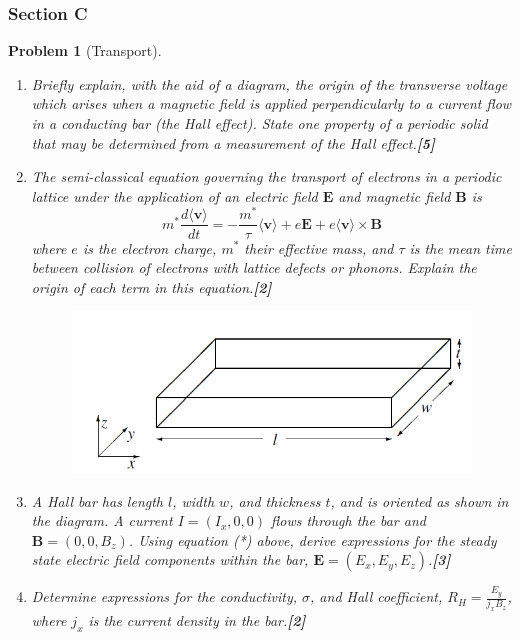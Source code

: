 \documentclass[a4paper]{article}
\theoremstyle{new}
\newtheorem{qns}{Problem}[subsection]
\begin{document}
\subsubsection{Section C}
\begin{qns}[Transport]\leavevmode
\begin{enumerate}[label=(\roman*)]
\item Briefly explain, with the aid of a diagram, the origin of the transverse voltage which arises when a magnetic field is applied perpendicularly to a current flow in a conducting bar (the Hall effect). State one property of a periodic solid that may be determined from a measurement of the Hall effect.\hfill\textbf{[5]}
\item The semi-classical equation governing the transport of electrons in a periodic lattice under the application of an electric field $\mathbf{E}$ and magnetic field $\mathbf{B}$ is
\begin{equation}
  m^*\frac{d\langle\mathbf{v}\rangle}{dt}=-\frac{m^*}{\tau}\langle\mathbf{v}\rangle+e\mathbf{E}+e\langle\mathbf{v}\rangle\times\mathbf{B}\tag{*}  
\end{equation}
where $e$ is the electron charge, $m^*$ their effective mass, and $\tau$ is the mean time between collision of electrons with lattice defects or phonons. Explain the origin of each term in this equation.\hfill\textbf{[2]}
\begin{figure}[H]
    \centering
    \includegraphics[scale=0.5]{2016P2C10Q.PNG}
\end{figure}
\item A Hall bar has length $l$, width $w$, and thickness $t$, and is oriented as shown in the diagram. A current $I = (I_x, 0, 0)$ flows through the bar and $\mathbf{B}=(0,0,B_z)$. Using equation (*) above, derive expressions for the steady state electric field components within the bar, $\mathbf{E}=(E_x,E_y,E_z)$.\hfill\textbf{[3]}
\item Determine expressions for the conductivity, $\sigma$, and Hall coefficient, $R_H=\frac{E_y}{j_xB_z}$, where $j_x$ is the current density in the bar.\hfill\textbf{[2]}

\end{enumerate}
\end{qns}
\end{document}
